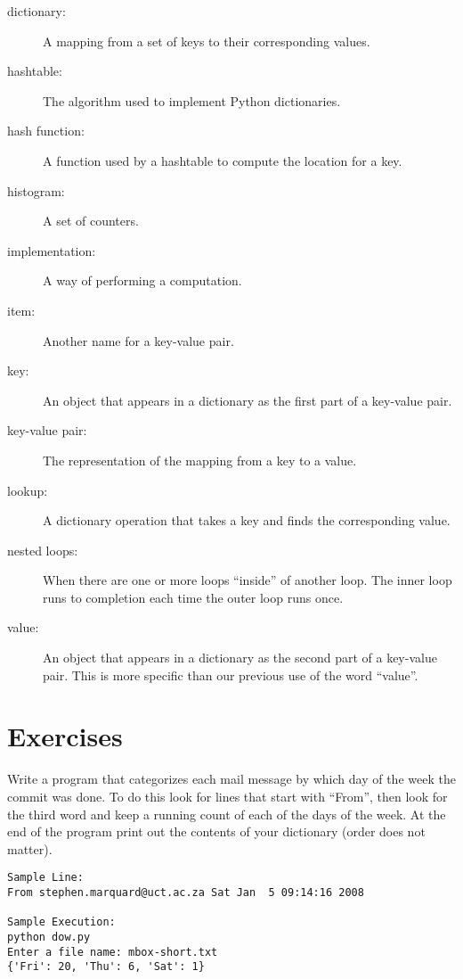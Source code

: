 \begin{description}

\item[dictionary:] A mapping from a set of keys to their
corresponding values.

\item[hashtable:] The algorithm used to implement Python
dictionaries.

\item[hash function:] A function used by a hashtable to compute the
location for a key.

\item[histogram:] A set of counters.

\item[implementation:] A way of performing a computation.

\item[item:] Another name for a key-value pair.

\item[key:] An object that appears in a dictionary as the
first part of a key-value pair.

\item[key-value pair:] The representation of the mapping from
a key to a value.

\item[lookup:] A dictionary operation that takes a key and finds
the corresponding value.

\item[nested loops:] When there are one or more loops ``inside'' of 
another loop.  The inner loop runs to completion each time the outer
loop runs once.

\item[value:] An object that appears in a dictionary as the
second part of a key-value pair.  This is more specific than
our previous use of the word ``value''.

\end{description}

\section{Exercises}

\begin{ex}
Write a program that categorizes each mail message by which 
day of the week the commit was done. To do this look for 
lines that start with ``From'', then look for the 
third word and keep a running count of each of the 
days of the week. At the end of the program print out the 
contents of your dictionary (order does not matter).

\beforeverb
\begin{verbatim}
Sample Line:
From stephen.marquard@uct.ac.za Sat Jan  5 09:14:16 2008

Sample Execution:
python dow.py
Enter a file name: mbox-short.txt
{'Fri': 20, 'Thu': 6, 'Sat': 1}
\end{verbatim}
\afterverb
\end{ex}

